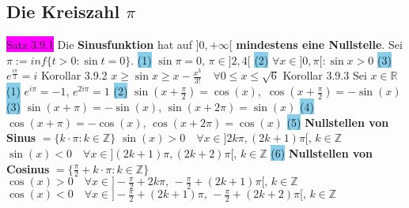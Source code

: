 \documentclass[landscape, 10pt]{article}
\newcommand{\R}{\mathbb{R}}
\begin{document}
\begin{multicols}{3}
\subsection{Die Kreiszahl $\pi$}
\colorbox{magenta}{Satz 3.9.1} Die \textbf{Sinusfunktion} hat auf 
                \textcolor{NavyBlue}{$]0,+\infty[$}
                \textbf{mindestens eine Nullstelle}. Sei 
                \textcolor{NavyBlue}{$\pi:=inf\{t>0:\sin t=0\}$}.
         \colorbox{SkyBlue}{(1)} \textcolor{NavyBlue}{$\sin\pi=0,\,\pi\in]2,4[$} 
                \qquad\qquad
                \colorbox{SkyBlue}{(2)} \textcolor{NavyBlue}{$\forall x\in]0,\pi[:\sin x>0$}
                \qquad\qquad
                \colorbox{SkyBlue}{(3)} \textcolor{NavyBlue}{$e^{\frac{i\pi}{2}}=i$}
\colorbox{BurntOrange}{Korollar 3.9.2} \textcolor{NavyBlue}{
                $x\geqslant\sin x\geqslant x-\frac{x^3}{3!}\quad
                \forall0\leqslant x\leqslant\sqrt{6}$}
\colorbox{BurntOrange}{Korollar 3.9.3} Sei \textcolor{NavyBlue}{$x\in\R$}
                \colorbox{SkyBlue}{(1)} \textcolor{NavyBlue}{$e^{i\pi}=-1,\,e^{2i\pi}=1$} 
                \colorbox{SkyBlue}{(2)} 
                \textcolor{NavyBlue}{$\sin(x+\frac{\pi}{2})=\cos(x)$},\,
                \textcolor{NavyBlue}{$\cos(x+\frac{\pi}{2})=-\sin(x)$} 
         \colorbox{SkyBlue}{(3)} 
                \textcolor{NavyBlue}{$\sin(x+\pi)=-\sin(x),\,\sin(x+2\pi)=\sin(x)$}
                \colorbox{SkyBlue}{(4)}
                \textcolor{NavyBlue}{$\cos(x+\pi)=-\cos(x),\,\cos(x+2\pi)=\cos(x)$}
         \colorbox{SkyBlue}{(5)} \textbf{Nullstellen von Sinus} 
                \textcolor{NavyBlue}{$=\{k\cdot\pi:k\in\mathbb{Z}\}$} \qquad
                \textcolor{NavyBlue}{
                $\sin(x)>0\quad\forall x\in]2k\pi,(2k+1)\pi[,\,k\in\mathbb{Z}$}
         \textcolor{NavyBlue}{
                $\sin(x)<0\quad\forall x\in](2k+1)\pi,(2k+2)\pi[,\,k\in\mathbb{Z}$} 
         \colorbox{SkyBlue}{(6)} \textbf{Nullstellen von Cosinus}
                \textcolor{NavyBlue}{$=\{\frac{\pi}{2}+k\cdot\pi:k\in\mathbb{Z}\}$}
                \textcolor{NavyBlue}{$\cos(x)>0\quad
                \forall x\in]-\frac{\pi}{2}+2k\pi,\,-\frac{\pi}{2}+(2k+1)\pi[,\,
                k\in\mathbb{Z}$} 
         \textcolor{NavyBlue}{$\cos(x)<0\quad
                \forall x\in]-\frac{\pi}{2}+(2k+1)\pi,\,-\frac{\pi}{2}+(2k+2)\pi[,\,
                k\in\mathbb{Z}$}

\end{multicols}
\end{document}
